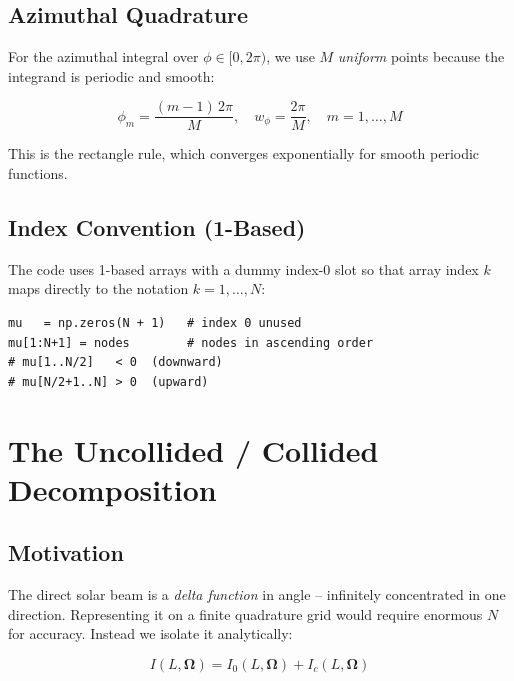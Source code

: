\documentclass[12pt]{article}
\begin{document}
\subsection{Azimuthal Quadrature}

For the azimuthal integral over $\phi \in [0, 2\pi)$, we use $M$ \emph{uniform}
points because the integrand is periodic and smooth:

\begin{equation}
  \phi_m = \frac{(m-1)\,2\pi}{M}, \quad
  w_\phi = \frac{2\pi}{M}, \quad m = 1,\ldots,M
\end{equation}

This is the rectangle rule, which converges exponentially for smooth periodic
functions.

\subsection{Index Convention (1-Based)}

The code uses 1-based arrays with a dummy index-0 slot so that array index
$k$ maps directly to the notation $k = 1, \ldots, N$:

\begin{lstlisting}
mu   = np.zeros(N + 1)   # index 0 unused
mu[1:N+1] = nodes        # nodes in ascending order
# mu[1..N/2]   < 0  (downward)
# mu[N/2+1..N] > 0  (upward)
\end{lstlisting}

\section{The Uncollided / Collided Decomposition}

\subsection{Motivation}

The direct solar beam is a \emph{delta function} in angle -- infinitely
concentrated in one direction. Representing it on a finite quadrature grid
would require enormous $N$ for accuracy. Instead we isolate it analytically:

\begin{equation}
  I(L, \boldsymbol{\Omega}) = I_0(L, \boldsymbol{\Omega})
                             + I_c(L, \boldsymbol{\Omega})
\end{equation}
\end{document}
